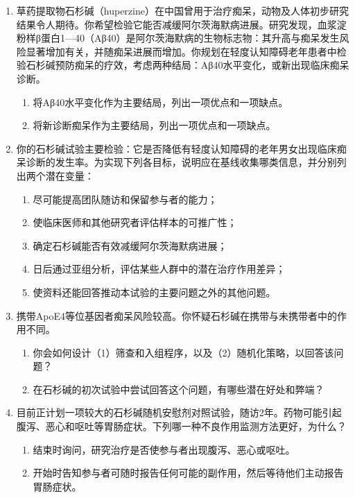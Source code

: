 

\begin{enumerate}
\item 草药提取物石杉碱（huperzine）在中国曾用于治疗痴呆，动物及人体初步研究结果令人期待。你希望检验它能否减缓阿尔茨海默病进展。研究发现，血浆淀粉样β蛋白1—40（Aβ40）是阿尔茨海默病的生物标志物：其升高与痴呆发生风险显著增加有关，并随痴呆进展而增加。你规划在轻度认知障碍老年患者中检验石杉碱预防痴呆的疗效，考虑两种结局：Aβ40水平变化，或新出现临床痴呆诊断。
\begin{enumerate}
\item 将Aβ40水平变化作为主要结局，列出一项优点和一项缺点。
\item 将新诊断痴呆作为主要结局，列出一项优点和一项缺点。
\end{enumerate}
\item 你的石杉碱试验主要检验：它是否降低有轻度认知障碍的老年男女出现临床痴呆诊断的发生率。为实现下列各目标，说明应在基线收集哪类信息，并分别列出两个潜在变量：
\begin{enumerate}
\item 尽可能提高团队随访和保留参与者的能力；
\item 使临床医师和其他研究者评估样本的可推广性；
\item 确定石杉碱能否有效减缓阿尔茨海默病进展；
\item 日后通过亚组分析，评估某些人群中的潜在治疗作用差异；
\item 使资料还能回答推动本试验的主要问题之外的其他问题。
\end{enumerate}
\item 携带ApoE4等位基因者痴呆风险较高。你怀疑石杉碱在携带与未携带者中的作用不同。
\begin{enumerate}
\item 你会如何设计（1）筛查和入组程序，以及（2）随机化策略，以回答该问题？
\item 在石杉碱的初次试验中尝试回答这个问题，有哪些潜在好处和弊端？
\end{enumerate}
\item 目前正计划一项较大的石杉碱随机安慰剂对照试验，随访2年。药物可能引起腹泻、恶心和呕吐等胃肠症状。下列哪一种不良作用监测方法更好，为什么？
\begin{enumerate}
\item 结束时询问，研究治疗是否使参与者出现腹泻、恶心或呕吐。
\item 开始时告知参与者可随时报告任何可能的副作用，然后等待他们主动报告胃肠症状。

\end{enumerate}
\end{enumerate}
